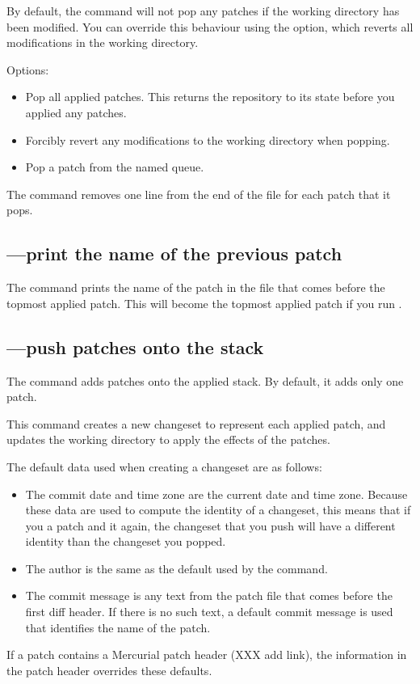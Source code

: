 By default, the  command will not pop any patches if the
working directory has been modified.  You can override this behaviour
using the  option, which reverts all modifications in
the working directory.

Options:
\begin{itemize}
\item[\hgopt{qpop}{-a}] Pop all applied patches.  This returns the
  repository to its state before you applied any patches.
\item[\hgopt{qpop}{-f}] Forcibly revert any modifications to the
  working directory when popping.
\item[\hgopt{qpop}{-n}] Pop a patch from the named queue.
\end{itemize}

The  command removes one line from the end of the
 file for each patch that it pops.

\subsection{---print the name of the previous patch}

The  command prints the name of the patch in the
 file that comes before the topmost applied patch.
This will become the topmost applied patch if you run .

\subsection{---push patches onto the stack}
\label{sec:mq:cmd:qpush}

The  command adds patches onto the applied stack.  By
default, it adds only one patch.

This command creates a new changeset to represent each applied patch,
and updates the working directory to apply the effects of the patches.

The default data used when creating a changeset are as follows:
\begin{itemize}
\item The commit date and time zone are the current date and time
  zone.  Because these data are used to compute the identity of a
  changeset, this means that if you  a patch and
   it again, the changeset that you push will have a
  different identity than the changeset you popped.
\item The author is the same as the default used by the 
  command.
\item The commit message is any text from the patch file that comes
  before the first diff header.  If there is no such text, a default
  commit message is used that identifies the name of the patch.
\end{itemize}
If a patch contains a Mercurial patch header (XXX add link), the
information in the patch header overrides these defaults.

